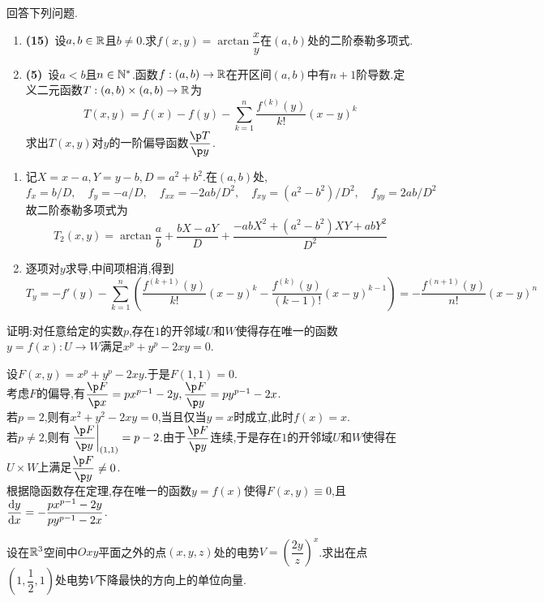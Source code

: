 \documentclass{ctexart}
\begin{document}
\begin{problem}[3.(20\songti{分})]
回答下列问题.
        \begin{enumerate}[label=\textbf{(\arabic*)},leftmargin=*]
            \item \textbf{(15)}\ 设$a,b\in\mathbb{R}$且$b\neq0$.求$f(x,y)=\arctan\dfrac xy$在$(a,b)$处的二阶泰勒多项式.
            \item \textbf{(5)}\ 设$a<b$且$n\in\mathbb{N}^*$.函数$f:(a,b)\to\mathbb{R}$在开区间$(a,b)$中有$n+1$阶导数.定义二元函数$T:(a,b)\times(a,b)\to\mathbb{R}$为
                \[T(x,y)=f(x)-f(y)-\sum_{k=1}^n\dfrac{f^{(k)}(y)}{k!}(x-y)^k\]
                求出$T(x,y)$对$y$的一阶偏导函数$\dfrac{\p T}{\p y}$.
        \end{enumerate}
\end{problem}
\begin{solution}
\begin{enumerate}[label=\tbf{(\arabic*)},leftmargin=*]
\item 记$X=x-a,Y=y-b,D=a^2+b^2$.在$(a,b)$处,
\[f_x=b/D,\quad f_y=-a/D,\quad f_{xx}=-2ab/D^2,\quad
f_{xy}=(a^2-b^2)/D^2,\quad f_{yy}=2ab/D^2\]
故二阶泰勒多项式为
\[T_2(x,y)=\arctan\dfrac ab+\dfrac{bX-aY}{D}
+\dfrac{-abX^2+(a^2-b^2)XY+abY^2}{D^2}\]
\item 逐项对$y$求导,中间项相消,得到
\[T_y=-f'(y)-\sum_{k=1}^n\left(\dfrac{f^{(k+1)}(y)}{k!}(x-y)^k
-\dfrac{f^{(k)}(y)}{(k-1)!}(x-y)^{k-1}\right)
=-\dfrac{f^{(n+1)}(y)}{n!}(x-y)^n\]
\end{enumerate}
\end{solution}
\begin{problem}[4.(10\songti{分})]
证明:对任意给定的实数$p$,存在$1$的开邻域$U$和$W$使得存在唯一的函数$y=f(x):U\to W$满足$x^p+y^p-2xy=0$.
\end{problem}
\begin{solution}
设$F(x,y)=x^p+y^p-2xy$.于是$F(1,1)=0$.\\
    考虑$F$的偏导,有$\dfrac{\p F}{\p x}=px^{p-1}-2y,\dfrac{\p F}{\p y}=py^{p-1}-2x$.\\
    若$p=2$,则有$x^2+y^2-2xy=0$,当且仅当$y=x$时成立,此时$f(x)=x$.\\
    若$p\neq 2$,则有$\left.\dfrac{\p F}{\p y}\right|_{(1,1)}=p-2$.由于$\dfrac{\p F}{\p y}$连续,于是存在$1$的开邻域$U$和$W$使得在$U\times W$上满足$\dfrac{\p F}{\p y}\neq0$.\\
    根据隐函数存在定理,存在唯一的函数$y=f(x)$使得$F(x,y)\equiv0$,且$\dfrac{\mathrm{d} y}{\mathrm{d} x}=-\dfrac{px^{p-1}-2y}{py^{p-1}-2x}$.
\end{solution}
\begin{problem}[5.(15\songti{分})]
设在$\mathbb{R}^3$空间中$Oxy$平面之外的点$(x,y,z)$处的电势$V=\left(\dfrac{2y}z\right)^x$.求出在点$\left(1,\dfrac12,1\right)$处电势$V$下降最快的方向上的单位向量.
\end{problem}
\end{document}
